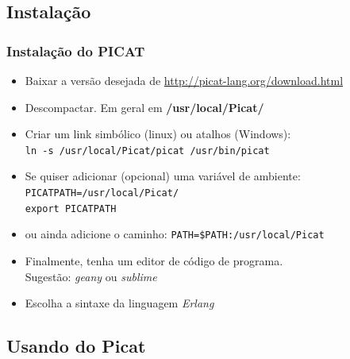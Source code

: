 \documentclass[10pt]{beamer}
\begin{document}
\subsection{Instalação}
\begin{frame}
    \frametitle{Instalação do PICAT}

  \begin{itemize}
    \item Baixar a versão desejada de \url{http://picat-lang.org/download.html}
   \item Descompactar. Em geral em \textbf{/usr/local/Picat/}
    \item Criar um link simbólico (linux) ou atalhos (Windows):\\ 
   \texttt{ln -s /usr/local/Picat/picat   \hspace{1cm}   /usr/bin/picat}
    \item Se quiser adicionar (opcional) uma variável de ambiente:\\
          \texttt{PICATPATH=/usr/local/Picat/}\\
          \texttt{export PICATPATH}

    \item ou ainda adicione o caminho: \texttt{PATH=\$PATH:/usr/local/Picat}

   \item Finalmente, tenha um editor de código de programa.\\
     Sugestão: \textit{geany} ou \textit{sublime}
     
    \item Escolha a sintaxe da linguagem \textit{Erlang} 
    
  \end{itemize}



\end{frame}



\subsection{Usando do Picat}
\end{document}
